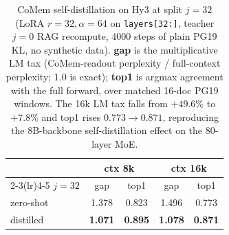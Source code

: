 \begin{table}[!htbp]
\centering
\small
\begin{tabular}{@{}lcccc@{}}
\toprule
 & \multicolumn{2}{c}{ctx 8k} & \multicolumn{2}{c}{ctx 16k} \\
\cmidrule(lr){2-3}\cmidrule(lr){4-5}
\textbf{$j{=}32$} & gap & top1 & gap & top1 \\
\midrule
zero-shot  & 1.378 & 0.823 & 1.496 & 0.773 \\
distilled  & \textbf{1.071} & \textbf{0.895} & \textbf{1.078} & \textbf{0.871} \\
\bottomrule
\end{tabular}
\caption{CoMem self-distillation on Hy3 at split $j{=}32$ (LoRA $r{=}32,
\alpha{=}64$ on \texttt{layers[32:]}, teacher $j{=}0$ RAG recompute, 4000 steps of
plain PG19 KL, no synthetic data). \textbf{gap} is the multiplicative LM tax
(CoMem-readout perplexity / full-context perplexity; $1.0$ is exact); \textbf{top1}
is argmax agreement with the full forward, over matched 16-doc PG19 windows. The
16k LM tax falls from $+49.6\%$ to $+7.8\%$ and top1 rises $0.773\to0.871$,
reproducing the 8B-backbone self-distillation effect on the 80-layer MoE.}
\label{tab:hy3distill}
\end{table}
